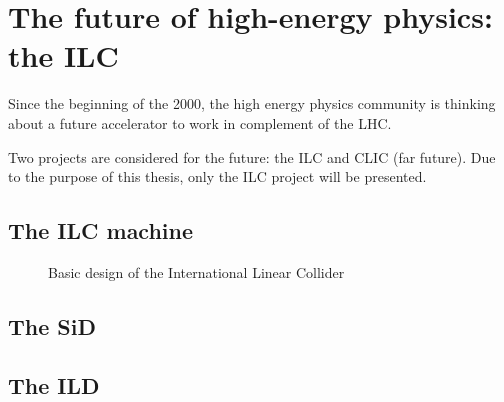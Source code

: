 \chapter{The future of high-energy physics: the ILC}


  Since the beginning of the 2000, the high energy physics community is thinking about a future accelerator to work in complement of the LHC.


  Two projects are considered for the future: the ILC and CLIC (far future).
  Due to the purpose of this thesis, only the ILC project will be presented. 
  
  
   
  \section{The ILC machine}

  \begin{figure}
    \centering
    \caption{Basic design of the International Linear Collider}
    \label{fig:ILC}
  \end{figure}
  \section{The SiD}

  \section{The ILD}
